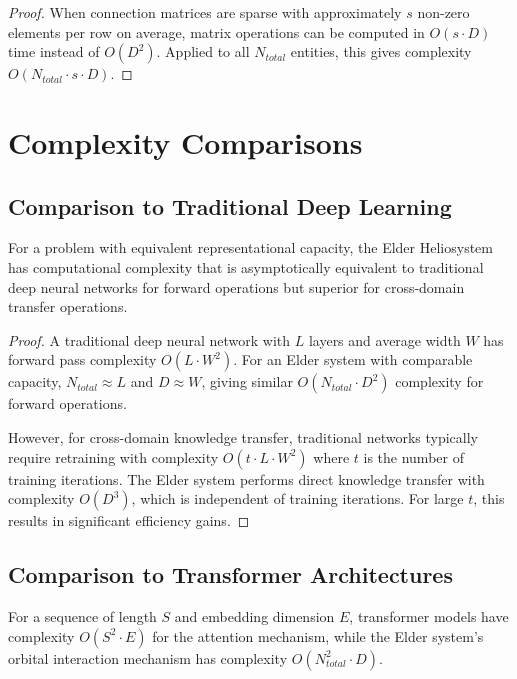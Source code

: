 \begin{proof}
When connection matrices are sparse with approximately $s$ non-zero elements per row on average, matrix operations can be computed in $O(s \cdot D)$ time instead of $O(D^2)$. Applied to all $N_{total}$ entities, this gives complexity $O(N_{total} \cdot s \cdot D)$.
\end{proof}

\section{Complexity Comparisons}



\subsection{Comparison to Traditional Deep Learning}

\begin{theorem}
For a problem with equivalent representational capacity, the Elder Heliosystem has computational complexity that is asymptotically equivalent to traditional deep neural networks for forward operations but superior for cross-domain transfer operations.
\end{theorem}

\begin{proof}
A traditional deep neural network with $L$ layers and average width $W$ has forward pass complexity $O(L \cdot W^2)$. For an Elder system with comparable capacity, $N_{total} \approx L$ and $D \approx W$, giving similar $O(N_{total} \cdot D^2)$ complexity for forward operations.

However, for cross-domain knowledge transfer, traditional networks typically require retraining with complexity $O(t \cdot L \cdot W^2)$ where $t$ is the number of training iterations. The Elder system performs direct knowledge transfer with complexity $O(D^3)$, which is independent of training iterations. For large $t$, this results in significant efficiency gains.
\end{proof}

\subsection{Comparison to Transformer Architectures}

\begin{theorem}
For a sequence of length $S$ and embedding dimension $E$, transformer models have complexity $O(S^2 \cdot E)$ for the attention mechanism, while the Elder system's orbital interaction mechanism has complexity $O(N_{total}^2 \cdot D)$.
\end{theorem}

